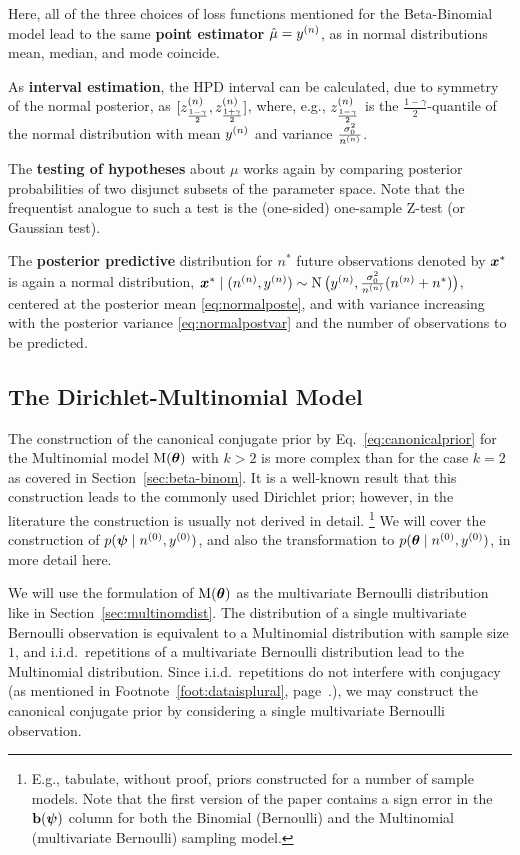 Here, all of the three choices of loss functions mentioned for the Beta-Binomial model
lead to the same \textbf{point estimator} $\hat{\mu} = y^{(n)}$,
as in normal distributions mean, median, and mode coincide.

As \textbf{interval estimation}, the HPD interval can be calculated, due to symmetry of the normal posterior,
as $[z^{(n)}_\frac{1-\gamma}{2}, z^{(n)}_\frac{1+\gamma}{2}]$, where, e.g.,
$z^{(n)}_\frac{1-\gamma}{2}$ is the $\frac{1-\gamma}{2}$-quantile of the normal distribution with mean $y^{(n)}$ and variance $\frac{\sigma_0^2}{n^{(n)}}$.

The \textbf{testing of hypotheses} about $\mu$ works again by comparing posterior probabilities of two disjunct subsets of the parameter space.
Note that the frequentist analogue to such a test is the (one-sided) one-sample Z-test (or Gaussian test).

The \textbf{posterior predictive} distribution for $n^*$ future observations denoted by ${\bm x}^*$ is again a normal distribution,
${\bm x}^*\mid(n^{(n)},y^{(n)}) \sim \operatorname{N}\big(y^{(n)}, \frac{\sigma_0^2}{n^{(n)}}(n^{(n)} + n^*)\big)$,
centered at the posterior mean \eqref{eq:normalposte},
and with variance increasing with the posterior variance \eqref{eq:normalpostvar}
and the number of observations to be predicted.


\subsection{The Dirichlet-Multinomial Model}
\label{sec:diri-multi}

The construction of the canonical conjugate prior by Eq.~\eqref{eq:canonicalprior}
for the Multinomial model $\operatorname{M}(\boldsymbol{\theta})$ with $k>2$ is more complex than for the case $k=2$
as covered in Section~\ref{sec:beta-binom}.
It is a well-known result that this construction leads to the commonly used Dirichlet prior;
however, in the literature the construction is usually not derived in detail.%
\footnote{E.g., \textcite[Table~1]{2005:quaeghebeurcooman} tabulate, without proof,
priors constructed for a number of sample models.
Note that the first version of the paper contains a sign error in the $\mathbf{b}(\boldsymbol{\psi})$ column
for both the Binomial (Bernoulli) and the Multinomial (multivariate Bernoulli) sampling model.}
We will cover the construction of $p(\boldsymbol{\psi}\mid n^{(0)}, y^{(0)})$,
and also the transformation to $p(\boldsymbol{\theta}\mid n^{(0)}, y^{(0)})$,
in more detail here.

We will use the formulation of $\operatorname{M}(\boldsymbol{\theta})$ as the multivariate Bernoulli distribution
like in Section~\ref{sec:multinomdist}.
The distribution of a single multivariate Bernoulli observation is equivalent to a Multinomial distribution with sample size $1$,
and i.i.d.\ repetitions of a multivariate Bernoulli distribution lead to the Multinomial distribution.
Since i.i.d.\ repetitions do not interfere with conjugacy
(as mentioned in Footnote~\ref{foot:dataisplural}, page~\pageref{foot:dataisplural}.),
we may construct the canonical conjugate prior by considering a single multivariate Bernoulli observation.

